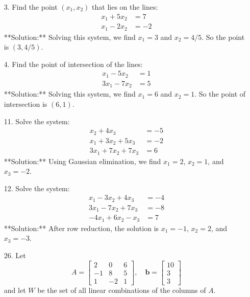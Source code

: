 \documentclass[12pt]{article}
\theoremstyle{definition}
\begin{document}
{\color{red}
\begin{enumerate}
    \item[3.] 
    Find the point $(x_1, x_2)$ that lies on the lines: 
    \[
    \begin{aligned}
        x_1 + 5x_2 &= 7 \\
        x_1 - 2x_2 &= -2
    \end{aligned}
    \]
    **Solution:** Solving this system, we find \( x_1 = 3 \) and \( x_2 = 4/5 \). So the point is \( (3, 4/5) \).
    
    \item[4.] 
    Find the point of intersection of the lines: 
    \[
    \begin{aligned}
        x_1 - 5x_2 &= 1 \\
        3x_1 - 7x_2 &= 5
    \end{aligned}
    \]
    **Solution:** Solving this system, we find \( x_1 = 6 \) and \( x_2 = 1 \). So the point of intersection is \( (6, 1) \).
    
    \item[11.] 
    Solve the system:
    \[
    \begin{aligned}
        x_2 + 4x_3 &= -5 \\
        x_1 + 3x_2 + 5x_3 &= -2 \\
        3x_1 + 7x_2 + 7x_3 &= 6
    \end{aligned}
    \]
    **Solution:** Using Gaussian elimination, we find \( x_1 = 2 \), \( x_2 = 1 \), and \( x_3 = -2 \).
    
    \item[12.] 
    Solve the system:
    \[
    \begin{aligned}
        x_1 - 3x_2 + 4x_3 &= -4 \\
        3x_1 - 7x_2 + 7x_3 &= -8 \\
        -4x_1 + 6x_2 - x_3 &= 7
    \end{aligned}
    \]
    **Solution:** After row reduction, the solution is \( x_1 = -1 \), \( x_2 = 2 \), and \( x_3 = -3 \).
    
    \item[26.] 
    Let 
    \[
    A = \begin{bmatrix} 2 & 0 & 6 \\ -1 & 8 & 5 \\ 1 & -2 & 1 \end{bmatrix}, \quad \mathbf{b} = \begin{bmatrix} 10 \\ 3 \\ 3 \end{bmatrix}
    \]
    and let \( W \) be the set of all linear combinations of the columns of \( A \).


\end{enumerate}}
\end{document}
